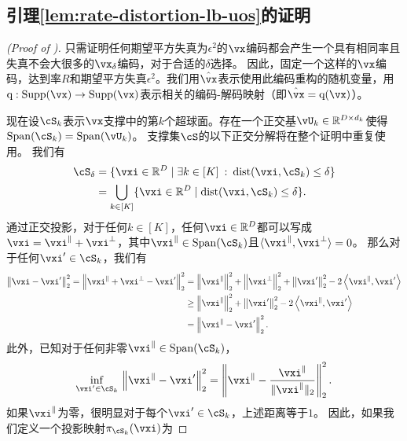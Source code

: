 \documentclass[../../book-main_zh.tex]{subfiles}
\begin{document}
\subsection{引理\ref{lem:rate-distortion-lb-uos}的证明}\label{sec:app-rate-dist-deferred-proofs}

\begin{proof}[(Proof of )]
    只需证明任何期望平方失真为$\epsilon^2$的$\vx$编码都会产生一个具有相同率且失真不会大很多的$\vx_{\delta}$编码，对于合适的$\delta$选择。
    因此，固定一个这样的$\vx$编码，达到率$R$和期望平方失真$\epsilon^2$。我们用$\hat{\vx}$表示使用此编码重构的随机变量，用$\mathrm{q} : \Supp(\vx) \to \Supp(\vx)$表示相关的编码-解码映射（即$\hat{\vx} = \mathrm{q}(\vx)$）。

    现在设$\cS_k$表示$\vx$支撑中的第$k$个超球面。存在一个正交基$\vU_{k} \in \R^{D \times d_k}$使得$\Span(\cS_k) = \Span(\vU_k)$。
    支撑集$\cS$的以下正交分解将在整个证明中重复使用。
    我们有
    \begin{align}
        \cS_{\delta} 
        &= \set{\vxi \in \R^D \given \exists k \in [K] \::\: \dist(\vxi,
        \cS_k) \leq \delta}
        \\
        &= \bigcup_{k \in [K]} \set{\vxi \in \R^D \given \dist(\vxi,
        \cS_k) \leq \delta}.
    \end{align}
    通过正交投影，对于任何$k \in [K]$，任何$\vxi \in \R^D$都可以写成$\vxi = \vxi^{\|} + \vxi^{\perp}$，其中$\vxi^{\|} \in \Span(\cS_k)$且$\ip{\vxi^{\|}}{\vxi^\perp} = 0$。
    那么对于任何$\vxi' \in \cS_k$，我们有
    \begin{align}
        \norm*{\vxi - \vxi'}_2^2 
        = 
        \norm*{\vxi^{\|} + \vxi^{\perp} - \vxi'}_2^2
        &=
        \norm*{\vxi^{\|}}_2^2 + \norm*{\vxi^{\perp}}_2^2 + \norm*{\vxi'}_2^2
        - 2 \ip*{\vxi^{\|}}{\vxi'}
        \\
        &\geq
        \norm*{\vxi^{\|}}_2^2 + \norm*{\vxi'}_2^2
        - 2 \ip*{\vxi^{\|}}{\vxi'}
        \\
        &=
        \norm*{\vxi^{\|} - \vxi'}_2^2.
    \end{align}
    此外，已知对于任何非零$\vxi^{\|} \in \Span(\cS_k)$，
    \begin{equation}
        \inf_{\vxi' \in \cS_k}\,
        \norm*{\vxi^{\|} - \vxi'}_2^2
        =
        \norm*{\vxi^{\|} - \frac{\vxi^{\|}}{\norm{\vxi^{\|}}_2}}_2^2.
    \end{equation}
    如果$\vxi^{\|}$为零，很明显对于每个$\vxi' \in \cS_k$，上述距离等于$1$。
    因此，如果我们定义一个投影映射$\pi_{\cS_k}(\vxi)$为

\end{proof}
\end{document}
